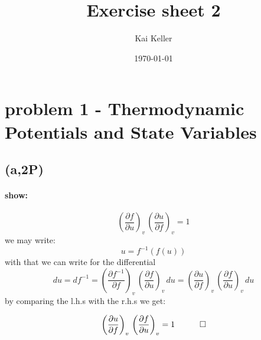 \documentclass[a4paper]{article}
\title{Exercise sheet 2}
\author{Kai Keller}
\date{\today}
\begin{document}
\maketitle
\tableofcontents

\section{problem 1 - Thermodynamic Potentials and State Variables}
\subsection{(a,2P)}
\paragraph{show:}
\begin{equation}
    \left(\frac{\partial f}{\partial u}\right)_v \, \left(\frac{\partial u}{\partial f}\right)_v = 1 
\end{equation} 
we may write:
\begin{equation}
    u=f^{-1}\left(f(u)\right)
\end{equation}
with that we can write for the differential
\begin{equation}
    du=df^{-1}=\left(\frac{\partial f^{-1}}{\partial f}\right)_v\,\left(\frac{\partial f}{\partial u}\right)_v\, du=\left(\frac{\partial u}{\partial f}\right)_v\,\left(\frac{\partial f}{\partial u}\right)_v\, du
\end{equation}
by comparing the l.h.s with the r.h.s we get:
\begin{framed}
\begin{equation}
    \left(\frac{\partial u}{\partial f}\right)_v\,\left(\frac{\partial f}{\partial u}\right)_v=1 \quad \qed
\end{equation}
\end{framed}
\end{document}
